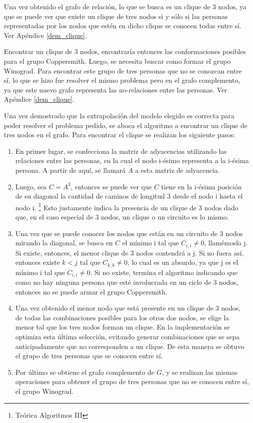 \documentclass[a4paper, 12pt]{article}
\begin{document}
Una vez obtenido el grafo de relación, lo que se busca es un clique de 3 nodos, ya que se puede ver que existe un clique de tres nodos si y sólo si las personas representadas por los nodos que estén en dicho clique se conocen todas entre sí. Ver Apéndice \ref{dem_clique}.


Encontrar un clique de 3 nodos, encontraría entonces las conformaciones posibles para el grupo Coppersmith. Luego, se necesita buscar como formar el grupo Winograd. Para encontrar este grupo de tres personas que no se conozcan entre sí, lo que se hizo fue resolver el mismo problema pero en el grafo complemento, ya que este nuevo grafo representa las no-relaciones entre las personas. Ver Apéndice \ref{dem_clique}.

Una vez demostrado que la extrapolación del modelo elegido es correcta para poder resolver el problema pedido, se aboca el algoritmo a encontrar un clique de tres nodos en el grafo.
Para encontrar el clique se realizan los siguiente pasos:

\begin{enumerate}
\item En primer lugar, se confecciona la matriz de adyacencias utilizando las relaciones entre las personas, en la cual el nodo i-ésimo representa a la i-ésima persona. A partir de aquí, se llamará $A$ a esta matriz de adyacencia.
\item Luego, sea $C = A^3$, entonces se puede ver que $C$ tiene en la i-ésima posición de su diagonal la cantidad de caminos de longitud 3 desde el nodo i hasta el nodo i. \footnote{Teórica Algoritmos III} Esto justamente indica la presencia de un clique de 3 nodos dado que, en el caso especial de 3 nodos, un clique o un circuito es lo mismo.
\item Una vez que se puede conocer los nodos que están en un circuito de 3 nodos mirando la diagonal, se busca en $C$ el mínimo i tal que $C_{i,i} \neq 0$, llamémoslo j. Si existe, entonces, el menor clique de 3 nodos contendrá a j. Si no fuera así, entonces existe $k < j$ tal que $C_{k,k} \neq 0$, lo cual es un absurdo, ya que j es el mínimo i tal que $C_{i,i} \neq 0$. Si no existe, termina el algoritmo indicando que como no hay ninguna persona que esté involucrada en un ciclo de 3 nodos, entonces no se puede armar el grupo Coppersmith.
\item Una vez obtenido el menor nodo que está presente en un clique de 3 nodos, de todas las combinaciones posibles para los otros dos nodos, se elige la menor tal que los tres nodos forman un clique. En la implementación se optimiza esta última selección, evitando generar combinaciones que se sepa anticipadamente que no corresponden a un clique. De esta manera se obtuvo el grupo de tres personas que se conocen entre sí.
\item Por último se obtiene el grafo complemento de $G$, y se realizan las mismas operaciones para obtener el grupo de tres personas que no se conocen entre sí, el grupo Winograd.
\end{enumerate}
\end{document}
